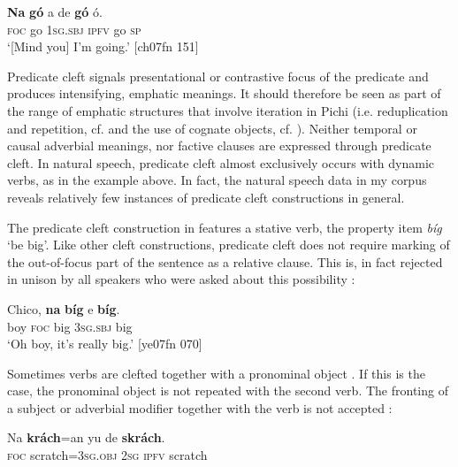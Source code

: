 \ea%
    \label{ex:key:732}
    \gll \textbf{Na}  \textbf{gó}  a    de  \textbf{gó}  ó.\\
\textsc{foc}  go  \textsc{1sg.sbj}  \textsc{ipfv}  go  \textsc{sp}\\

\glt ‘[Mind you] I’m going.’ [ch07fn 151]
\z

Predicate cleft signals presentational or contrastive focus of the predicate and produces intensifying, emphatic meanings. It should therefore be seen as part of the range of emphatic structures that involve iteration in Pichi (i.e. reduplication and repetition, cf.  and the use of cognate objects, cf. ). Neither temporal or causal adverbial meanings, nor factive clauses are expressed through predicate cleft. In natural speech, predicate cleft almost exclusively occurs with dynamic verbs, as in the example above. In fact, the natural speech data in my corpus reveals relatively few instances of predicate cleft constructions in general.


The predicate cleft construction in  features a stative verb, the property item \textit{bíg} ‘be big’. Like other cleft constructions, predicate cleft does not require marking of the out-of-focus part of the sentence as a relative clause. This is, in fact rejected in unison by all speakers who were asked about this possibility : 



\ea%
    \label{ex:key:733}
    \gll Chico,  \textbf{na}  \textbf{bíg}   e    \textbf{bíg}.\\
boy    \textsc{foc}  big    \textsc{3sg.sbj}  big\\

\glt ‘Oh boy, it’s really big.’ [ye07fn 070]
\z


\z

Sometimes verbs are clefted together with a pronominal object . If this is the case, the pronominal object is not repeated with the second verb. The fronting of a subject or adverbial modifier together with the verb is not accepted :


\ea%
    \label{ex:key:735}
    \gll Na  \textbf{krách}=an    yu  de  \textbf{skrách}.\\
\textsc{foc}  scratch=\textsc{3sg.obj}  \textsc{2sg}  \textsc{ipfv}  scratch \\


